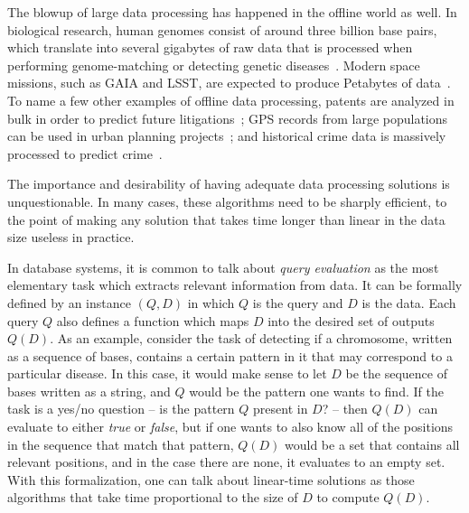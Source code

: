 The blowup of large data processing has happened in the offline world as well. In biological research, human genomes consist of around three billion base pairs, which translate into several gigabytes of raw data that is processed when performing genome-matching or detecting genetic diseases~\cite{genomes}. Modern space missions, such as GAIA and LSST, are expected to produce Petabytes of data~\cite{space}. To name a few other examples of offline data processing, patents are analyzed in bulk in order to predict future litigations~\cite{patents}; GPS records from large populations can be used in urban planning projects~\cite{urban}; and historical crime data is massively processed to predict crime~\cite{crime}.

The importance and desirability of having adequate data processing solutions is unquestionable. In many cases, these algorithms need to be sharply efficient, to the point of making any solution that takes time longer than linear in the data size useless in practice.

In database systems, it is common to talk about {\it query evaluation} as the most elementary task which extracts relevant information from data. It can be formally defined by an instance $(Q, D)$ in which $Q$ is the query and $D$ is the data. Each query $Q$ also defines a function which maps $D$ into the desired set of outputs $Q(D)$.
As an example, consider the task of detecting if a chromosome, written as a sequence of bases, contains a certain pattern in it that may correspond to a particular disease. In this case, it would make sense to let $D$ be the sequence of bases written as a string, and $Q$ would be the pattern one wants to find. If the task is a yes/no question -- is the pattern $Q$ present in $D$? -- then $Q(D)$ can evaluate to either {\it true} or {\it false}, but if one wants to also know all of the positions in the sequence that match that pattern, $Q(D)$ would be a set that contains all relevant positions, and in the case there are none, it evaluates to an empty set.
With this formalization, one can talk about linear-time solutions as those algorithms that take time proportional to the size of $D$ to compute $Q(D)$.

